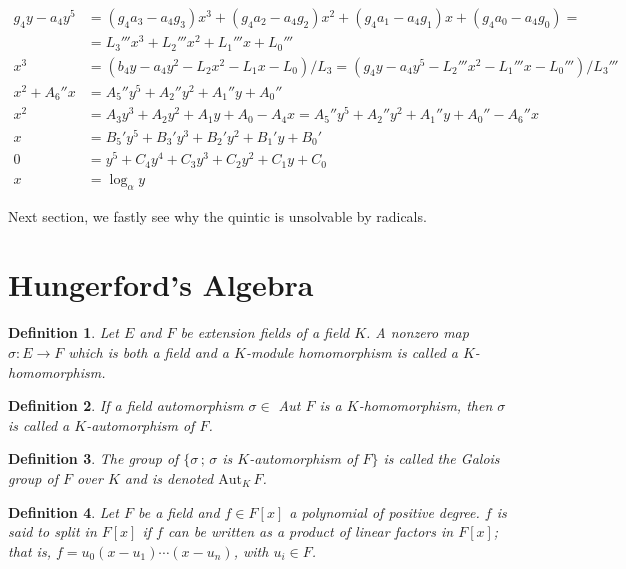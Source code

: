 \documentclass[12pt,a4paper]{article}
\newtheorem{definition}{Definition}[section]
\begin{document}
\begin{align}
g_4 y - a_4 y^5 &= (g_4 a_3 - a_4 g_3) x^3 + (g_4 a_2 - a_4 g_2) x^2 + (g_4 a_1 - a_4 g_1)x + (g_4 a_0 - a_4 g_0) = \nonumber \\
&= L_3''' x^3 + L_2''' x^2 + L_1''' x + L_0''' \\
x^3 &= (b_4 y - a_4 y^2 - L_2 x^2 - L_1 x - L_0)/L_3 = (g_4 y - a_4 y^5 - L_2''' x^2 - L_1''' x - L_0''')/L_3''' \\
x^2 + A_6'' x &= A_5'' y^5 + A_2'' y^2 + A_1'' y + A_0'' \\
x^2 &= A_3 y^3 + A_2 y^2 + A_1 y + A_0 - A_4 x = A_5'' y^5 + A_2'' y^2 + A_1'' y + A_0'' - A_6'' x \\
x &= B_5' y^5 + B_3' y^3 + B_2' y^2 + B_1' y + B_0' \\
0 &= y^5 + C_4 y^4 + C_3 y^3 + C_2 y^2 + C_1 y + C_0 \\
x &= \log_{\alpha} y
\end{align}

Next section, we fastly see why the quintic is unsolvable by radicals.

\section{Hungerford's Algebra}

\begin{definition}
Let $E$ and $F$ be extension fields of a field $K$. A nonzero map $\sigma: E \to F$ which is both a field and a $K$-module homomorphism is called a $K$-homomorphism.
\end{definition}

\begin{definition}
If a field automorphism $\sigma \in$ Aut $F$ is a $K$-homomorphism, then $\sigma$ is called a $K$-automorphism of $F$.
\end{definition}

\begin{definition}
The group of $\{\sigma\,;\, \sigma$ is $K$-automorphism of $F\}$ is called the Galois group of $F$ over $K$ and is denoted $\text{Aut}_K\,F$.
\end{definition}

\begin{definition}
Let $F$ be a field and $f \in F[x]$ a polynomial of positive degree. $f$ is said to split in $F[x]$ if $f$ can be written as a product of linear factors in $F[x]$; that is, $f = u_0(x - u_1)\cdots(x - u_n)$, with $u_i \in F$.
\end{definition}
\end{document}
